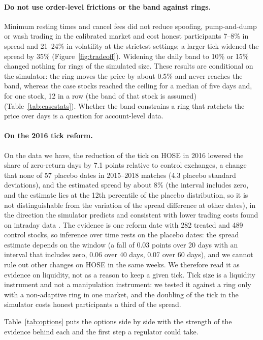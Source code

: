 \paragraph{Do not use order-level frictions or the band against rings.} Minimum resting times and cancel fees did not reduce spoofing, pump-and-dump or wash trading in the calibrated market and cost honest participants 7--8\% in spread and 21--24\% in volatility at the strictest settings; a larger tick widened the spread by 35\% (Figure~\ref{fig:tradeoff}). Widening the daily band to 10\% or 15\% changed nothing for rings of the simulated size. These results are conditional on the simulator: the ring moves the price by about 0.5\% and never reaches the band, whereas the case stocks reached the ceiling for a median of five days and, for one stock, 12 in a row (the band of that stock is assumed) (Table~\ref{tab:casestats}). Whether the band constrains a ring that ratchets the price over days is a question for account-level data.

\paragraph{On the 2016 tick reform.} On the data we have, the reduction of the tick on HOSE in 2016 lowered the share of zero-return days by 7.1 points relative to control exchanges, a change that none of 57 placebo dates in 2015--2018 matches (4.3 placebo standard deviations), and the estimated spread by about 8\% (the interval includes zero, and the estimate lies at the 12th percentile of the placebo distribution, so it is not distinguishable from the variation of the spread difference at other dates), in the direction the simulator predicts and consistent with lower trading costs found on intraday data \citep{vo2023}. The evidence is one reform date with 282 treated and 489 control stocks, so inference over time rests on the placebo dates: the spread estimate depends on the window (a fall of 0.03 points over 20 days with an interval that includes zero, 0.06 over 40 days, 0.07 over 60 days), and we cannot rule out other changes on HOSE in the same weeks. We therefore read it as evidence on liquidity, not as a reason to keep a given tick. Tick size is a liquidity instrument and not a manipulation instrument: we tested it against a ring only with a non-adaptive ring in one market, and the doubling of the tick in the simulator costs honest participants a third of the spread.

Table~\ref{tab:options} puts the options side by side with the strength of the evidence behind each and the first step a regulator could take.

